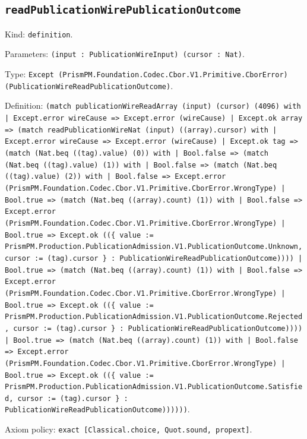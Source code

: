 \documentclass[11pt]{article}
\begin{document}
\subsection*{\texttt{readPublicationWirePublicationOutcome}}
\noindent Kind: \texttt{definition}.\par
\noindent Parameters: \texttt{(input : PublicationWireInput) (cursor : Nat)}.\par
\noindent Type: \texttt{Except (PrismPM.Foundation.Codec.Cbor.V1.Primitive.CborError) (PublicationWireReadPublicationOutcome)}.\par
\noindent Definition: \texttt{(match publicationWireReadArray (input) (cursor) (4096) with | Except.error wireCause => Except.error (wireCause) | Except.ok array => (match readPublicationWireNat (input) ((array).cursor) with | Except.error wireCause => Except.error (wireCause) | Except.ok tag => (match (Nat.beq ((tag).value) (0)) with | Bool.false => (match (Nat.beq ((tag).value) (1)) with | Bool.false => (match (Nat.beq ((tag).value) (2)) with | Bool.false => Except.error (PrismPM.Foundation.Codec.Cbor.V1.Primitive.CborError.WrongType) | Bool.true => (match (Nat.beq ((array).count) (1)) with | Bool.false => Except.error (PrismPM.Foundation.Codec.Cbor.V1.Primitive.CborError.WrongType) | Bool.true => Except.ok ((\{ value := PrismPM.Production.PublicationAdmission.V1.PublicationOutcome.Unknown, cursor := (tag).cursor \} : PublicationWireReadPublicationOutcome)))) | Bool.true => (match (Nat.beq ((array).count) (1)) with | Bool.false => Except.error (PrismPM.Foundation.Codec.Cbor.V1.Primitive.CborError.WrongType) | Bool.true => Except.ok ((\{ value := PrismPM.Production.PublicationAdmission.V1.PublicationOutcome.Rejected, cursor := (tag).cursor \} : PublicationWireReadPublicationOutcome)))) | Bool.true => (match (Nat.beq ((array).count) (1)) with | Bool.false => Except.error (PrismPM.Foundation.Codec.Cbor.V1.Primitive.CborError.WrongType) | Bool.true => Except.ok ((\{ value := PrismPM.Production.PublicationAdmission.V1.PublicationOutcome.Satisfied, cursor := (tag).cursor \} : PublicationWireReadPublicationOutcome))))))}.\par
\noindent Axiom policy: \texttt{exact [Classical.choice, Quot.sound, propext]}.\par
\end{document}
